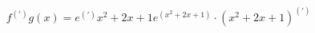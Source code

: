 \documentclass[preview]{standalone}
\begin{document}
\begin{align*}
f^(')g(x) = e^(') x^2+2x+1 e^(x^2+2x+1) \cdot (x^2+2x+1)^(')
\end{align*}
\end{document}
